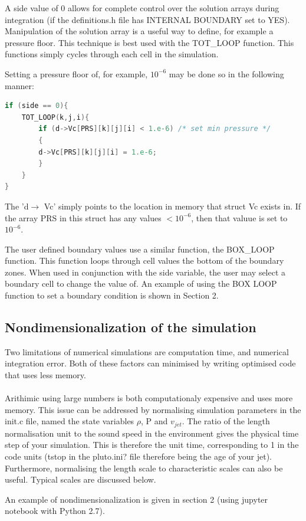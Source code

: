 \documentclass[12pt,a4paper]{report}
\begin{document}
A side value of 0 allows for complete control over the solution arrays during integration (if the definitions.h file has INTERNAL BOUNDARY set to YES). Manipulation of the solution array is a useful way to define, for example a pressure floor. This technique is best used with the TOT\_LOOP function. This functions simply cycles through each cell in the simulation.

Setting a pressure floor of, for example, $10^{-6}$ may be done so in the following manner:
\begin{lstlisting}[language=C++]
if (side == 0){
	TOT_LOOP(k,j,i){
		if (d->Vc[PRS][k][j][i] < 1.e-6) /* set min pressure */
		{
		d->Vc[PRS][k][j][i] = 1.e-6;
		}
	}
}
\end{lstlisting}
The  'd$\rightarrow$ Vc' simply points to the location in memory that struct Vc exists in. If the array PRS in this struct has any values $< 10^{-6}$, then that valuue is set to $10^{-6}$.

The user defined boundary values use a similar function, the BOX\_LOOP function. This function loops through cell values the bottom of the boundary zones. When used in conjunction with the side variable, the user may select a boundary cell to change the value of. An example of using the BOX LOOP function to set a boundary condition is shown in Section 2.

\subsection{Nondimensionalization of the simulation}
Two limitations of numerical simulations are computation time, and numerical integration error. Both of these factors can minimised by writing optimised code that uses less memory.\\
\\
Arithimic using large numbers is both computationaly expensive and uses more memory. This issue can be addressed by normalising simulation parameters in the init.c file, named the state variables $\rho$, P and $v_{jet}$. The ratio of the length normalisation unit to the sound speed in the environment gives the physical time step of your simulation. This is therefore the unit time, corresponding to 1 in the code units (tstop in the pluto.ini? file therefore being the age of your jet). Furthermore, normalising the length scale to characteristic scales can also be useful. Typical scales are discussed below.

An example of nondimensionalization is given in section 2 (using jupyter notebook with Python 2.7).
\end{document}
